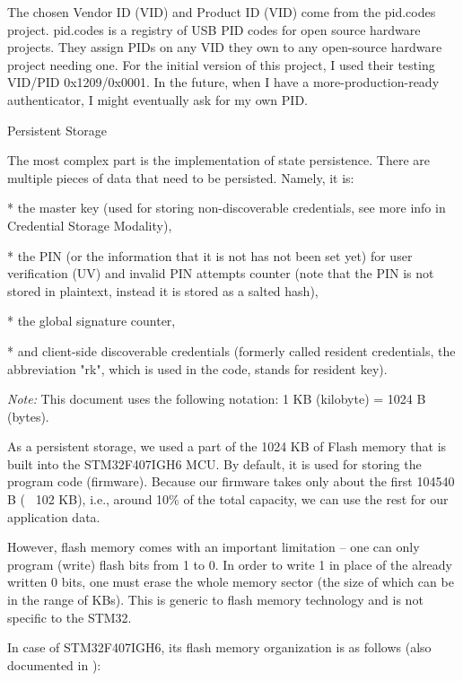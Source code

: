 The chosen Vendor ID (VID) and Product ID (VID) come from the pid.codes project.
pid.codes is a registry of USB PID codes for open source hardware projects. They assign PIDs on any VID they own to any open-source hardware project needing one.
For the initial version of this project, I used their testing VID/PID 0x1209/0x0001. In the future, when I have a more-production-ready authenticator, I might eventually ask for my own PID.

\secc Persistent Storage

The most complex part is the implementation of state persistence. There are multiple pieces of data that need to be persisted. Namely, it is:

\begitems

* the master key (used for storing non-discoverable credentials, see more info in Credential Storage Modality),

* the PIN (or the information that it is not has not been set yet) for user verification (UV) and invalid PIN attempts counter (note that the PIN is not stored in plaintext, instead it is stored as a salted hash),

* the global signature counter,

* and client-side discoverable credentials (formerly called resident credentials, the abbreviation "rk", which is used in the code, stands for {\sbf r}esident {\sbf k}ey).

\enditems

{\em Note:} This document uses the following notation: 1 KB (kilobyte) = 1024 B (bytes).

As a persistent storage, we used {\sbf a part of the 1024 KB of Flash memory} that is built into the STM32F407IGH6 MCU. By default, it is used for storing the program code (firmware). Because our firmware takes only about the first 104540 B (~ 102 KB), i.e., around 10\% of the total capacity, we can use the rest for our application data.

However, flash memory comes with {\sbf an important limitation} – one can only program (write) flash bits from 1 to 0. In order to write 1 in place of the already written 0 bits, one must {\sbf erase the whole memory sector} (the size of which can be in the range of KBs). This is generic to flash memory technology and is not specific to the STM32.

In case of STM32F407IGH6, its flash memory organization is as follows (also documented in ):

